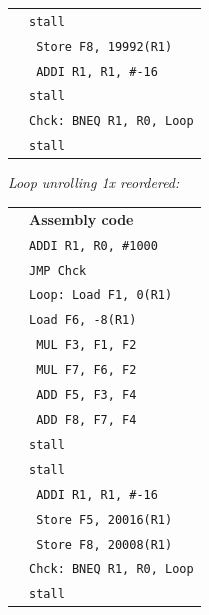 \documentclass[a4paper, 11pt]{exam}
\begin{document}
\begin{enumerate}
\begin{enumerate}
\begin{tabular}{ll}
	&\hspace{40pt}\texttt{stall}\\
	&\hspace{35pt}\texttt{ Store F8, 19992(R1)}\\
	&\hspace{35pt}\texttt{ ADDI R1, R1, \#-16}\\
	&\hspace{40pt}\texttt{stall}\\
	&\texttt{Chck: BNEQ R1, R0, Loop}\\
	&\hspace{40pt}\texttt{stall}\\
\end{tabular}

\hfill

\textit{Loop unrolling 1x reordered:}

\hfill

\begin{tabular}{ll}
	& \textbf{Assembly code }\\
	&\hspace{40pt}\texttt{ADDI R1, R0, \#1000} \\
	&\hspace{40pt}\texttt{JMP Chck}\\
	&\texttt{Loop: Load F1, 0(R1)} \\
	&\hspace{40pt}\texttt{Load F6, -8(R1)} \\
    &\hspace{35pt}\texttt{ MUL F3, F1, F2}\\
    &\hspace{35pt}\texttt{ MUL F7, F6, F2}\\
	&\hspace{35pt}\texttt{ ADD F5, F3, F4}\\
	&\hspace{35pt}\texttt{ ADD F8, F7, F4}\\
	&\hspace{40pt}\texttt{stall}\\
	&\hspace{40pt}\texttt{stall}\\
	&\hspace{35pt}\texttt{ ADDI R1, R1, \#-16}\\
	&\hspace{35pt}\texttt{ Store F5, 20016(R1)}\\
	&\hspace{35pt}\texttt{ Store F8, 20008(R1)}\\
	&\texttt{Chck: BNEQ R1, R0, Loop}\\
	&\hspace{40pt}\texttt{stall}\\
\end{tabular}


\end{enumerate}
\end{enumerate}
\end{document}
